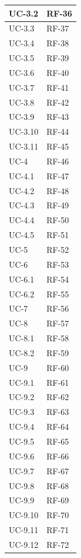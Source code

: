 \documentclass[8pt]{article}
\begin{document}
\begin{longtable}{|>{\centering\arraybackslash}p{4cm}|>{\centering\arraybackslash}p{7cm}|}
            UC-3.2 & RF-36\\ \hline
            UC-3.3 & RF-37\\ \hline
            UC-3.4 & RF-38\\ \hline
            UC-3.5 & RF-39\\ \hline
            UC-3.6 & RF-40\\ \hline
            UC-3.7 & RF-41\\ \hline
            UC-3.8 & RF-42\\ \hline
            UC-3.9 & RF-43\\ \hline
            UC-3.10 & RF-44\\ \hline
            UC-3.11 & RF-45\\ \hline
            UC-4 & RF-46\\ \hline
            UC-4.1 & RF-47\\ \hline
            UC-4.2 & RF-48\\ \hline
            UC-4.3 & RF-49\\ \hline
            UC-4.4 & RF-50\\ \hline
            UC-4.5 & RF-51\\ \hline
            UC-5 & RF-52\\ \hline
            UC-6 & RF-53\\ \hline
            UC-6.1 & RF-54\\ \hline
            UC-6.2 & RF-55\\ \hline
            UC-7 & RF-56\\ \hline
            UC-8 & RF-57\\ \hline
            UC-8.1 & RF-58\\ \hline
            UC-8.2 & RF-59\\ \hline
            UC-9 & RF-60\\ \hline
            UC-9.1 & RF-61\\ \hline
            UC-9.2 & RF-62\\ \hline
            UC-9.3 & RF-63\\ \hline
            UC-9.4 & RF-64\\ \hline
            UC-9.5 & RF-65\\ \hline
            UC-9.6 & RF-66\\ \hline
            UC-9.7 & RF-67\\ \hline
            UC-9.8 & RF-68\\ \hline
            UC-9.9 & RF-69\\ \hline
            UC-9.10 & RF-70\\ \hline
            UC-9.11 & RF-71\\ \hline
            UC-9.12 & RF-72\\ \hline
\end{longtable}
\end{document}
